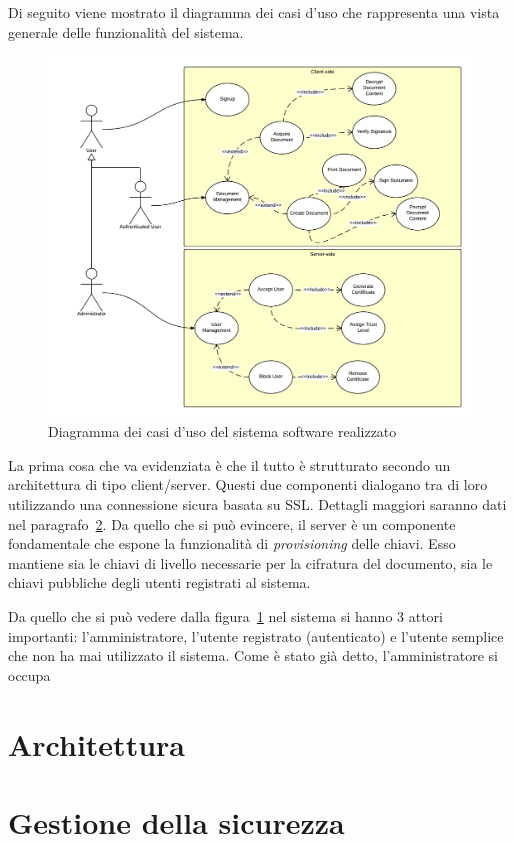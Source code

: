 Di seguito viene mostrato il diagramma dei casi d'uso che rappresenta una vista generale delle funzionalità del sistema.
	\begin{center}	
		\begin{figure}[H]
		\centering
		\includegraphics[scale=0.9]{Immagini/usecase}
		\caption[Use Case Diagram]{Diagramma dei casi d'uso del sistema software realizzato}
		\label{fig:usecase}
		\end{figure}
	\end{center}
La prima cosa che va evidenziata è che il tutto è strutturato secondo un architettura di tipo client/server. Questi due componenti dialogano tra di loro utilizzando una connessione sicura basata su SSL. Dettagli maggiori saranno dati nel paragrafo~\ref{sec:sicurezza}. Da quello che si può evincere, il server è un componente fondamentale che espone la funzionalità di \emph{provisioning} delle chiavi. Esso mantiene sia le chiavi di livello necessarie per la cifratura del documento, sia le chiavi pubbliche degli utenti registrati al sistema.

Da quello che si può vedere dalla figura~\ref{fig:usecase} nel sistema si hanno 3 attori importanti: l'amministratore, l'utente registrato (autenticato) e l'utente semplice che non ha mai utilizzato il sistema.
Come è stato già detto, l'amministratore si occupa 

\section{Architettura}
	\label{sec:architettura}
	


\section{Gestione della sicurezza}
	\label{sec:sicurezza}
